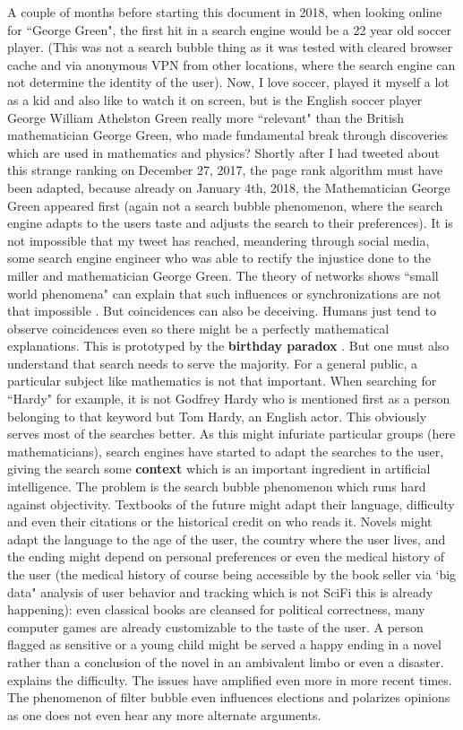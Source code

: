 \documentclass[12pt]{amsart}
\newcounter{example}    \def\example#1{ \item \fontsize{12}{15} \selectfont #1 \fontsize{12}{15} \selectfont }
\begin{document}
A couple of months before starting this document in 2018, when looking online for ``George Green",
the first hit in a search engine would be a 22 year old soccer player. 
(This was not a search bubble thing \cite{Filterbubble} as it was
tested with cleared browser cache and via anonymous VPN from other locations, where the search engine 
can not determine the identity of the user). Now, I love soccer, 
played it myself a lot as a kid and also like to watch it on screen, 
but is the English soccer player George William Athelston Green 
really more ``relevant" than the British mathematician George Green, who made fundamental 
break through discoveries which are used in mathematics and physics? 
Shortly after I had tweeted about this strange ranking on December 27, 2017, 
the page rank algorithm must have been adapted, because already on January 4th, 2018,
the Mathematician George Green appeared first (again not a search bubble phenomenon, where
the search engine adapts to the users taste and adjusts the search to their preferences). 
It is not impossible that my tweet has reached, meandering
through social media, some search engine engineer who was able to 
rectify the injustice done to the miller and mathematician George Green. 
The theory of networks shows ``small world phenomena" \cite{SixDegrees,Linked,SmallWorld} 
can explain that such influences or synchronizations are not that impossible \cite{Sync}. But
coincidences can also be deceiving. Humans just tend to observe coincidences even so there
might be a perfectly mathematical explanations. This is prototyped by the {\bf birthday paradox}
\cite{Fluke}. But one must also understand that search needs to serve the majority. 
For a general public, a particular subject like mathematics is not that important. 
When searching for ``Hardy" for example, it is not Godfrey Hardy who is 
mentioned first as a person belonging to that keyword 
but Tom Hardy, an English actor. This obviously serves most of the searches better. 
As this might infuriate particular groups (here mathematicians), search engines have started to adapt the 
searches to the user, giving the search some {\bf context} which is an important 
ingredient in artificial intelligence. The problem is the search bubble phenomenon which runs hard against 
objectivity. Textbooks of the future might adapt their language, difficulty and 
even their citations or the historical credit on who reads it. Novels might adapt the language to
the age of the user, the country where the user lives, and the ending might depend
on personal preferences or even the medical history of the user (the medical history of course being 
accessible by the book seller via `big data" analysis of user behavior and tracking which is not SciFi
this is already happening): even classical books are cleansed for political correctness, 
many computer games are already customizable to the taste of the user. 
A person flagged as sensitive or a young child might be served a happy ending in a novel rather 
than a conclusion of the novel in an ambivalent limbo or
even a disaster. \cite{Filterbubble} explains the difficulty. The issues have amplified
even more in more recent times. The phenomenon of filter bubble  even influences elections 
and polarizes opinions as one does not even hear any more alternate arguments.
\end{document}

